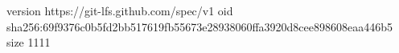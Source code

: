 version https://git-lfs.github.com/spec/v1
oid sha256:69f9376c0b5fd2bb517619fb55673e28938060ffa3920d8cee898608eaa446b5
size 1111
